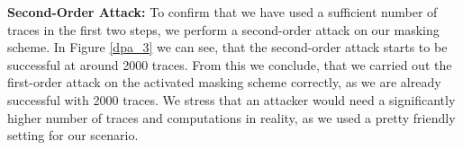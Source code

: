 \textbf{Second-Order Attack:} To confirm that we have used a sufficient number of traces in the first two steps, we perform a second-order attack on our masking scheme. In Figure \ref{dpa_3} we can see, that the second-order attack starts to be successful at around 2000 traces. From this we conclude, that we carried out the first-order attack on the activated masking scheme correctly, as we are already successful with 2000 traces. We stress that an attacker would need a significantly higher number of traces and computations in reality, as we used a pretty friendly setting for our scenario.